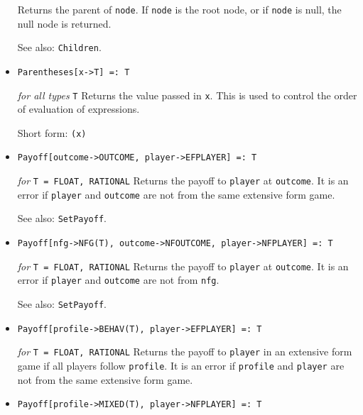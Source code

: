 \begin{itemize}
\bd
Returns the parent of \verb+node+.  If \verb+node+ is the root node,
or if \verb+node+ is null, the null node is returned.
\item [See also:] \verb+Children+.
\ed

\item{}
\protect \large \begin{verbatim}
Parentheses[x->T] =: T
\end{verbatim}\normalsize

{\it for all types} {\tt T}
\bd
Returns the value passed in \verb+x+.  This is used to control
the order of evaluation of expressions.
\item [Short form:] \verb+(x)+
\ed

\item{}
\protect \large \begin{verbatim}
Payoff[outcome->OUTCOME, player->EFPLAYER] =: T
\end{verbatim}\normalsize

{\it for} {\tt T = FLOAT, RATIONAL}
\bd
Returns the payoff to \verb+player+ at \verb+outcome+.  It is an error if
\verb+player+ and \verb+outcome+ are not from the same extensive form game.
\item [See also:] \verb+SetPayoff+.
\ed

\item{}
\protect \large \begin{verbatim}
Payoff[nfg->NFG(T), outcome->NFOUTCOME, player->NFPLAYER] =: T
\end{verbatim}\normalsize

{\it for} {\tt T = FLOAT, RATIONAL}
\bd
Returns the payoff to \verb+player+ at \verb+outcome+.  It is an error if
\verb+player+ and \verb+outcome+ are not from \verb+nfg+.
\item [See also:] \verb+SetPayoff+.
\ed

\item{}
\protect \large \begin{verbatim}
Payoff[profile->BEHAV(T), player->EFPLAYER] =: T
\end{verbatim}\normalsize

{\it for} {\tt T = FLOAT, RATIONAL}
\bd
Returns the payoff to \verb+player+ in an extensive form game if all
players follow \verb+profile+.  It is an error if \verb+profile+
and \verb+player+ are not from the same extensive form game.
\ed

\item{}
\protect \large \begin{verbatim}
Payoff[profile->MIXED(T), player->NFPLAYER] =: T
\end{verbatim}\normalsize


\end{itemize}
